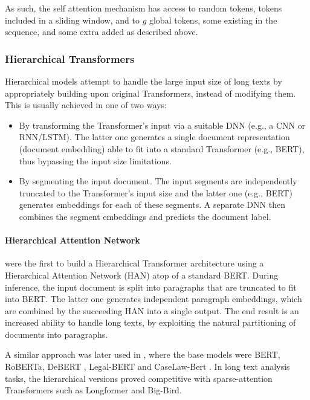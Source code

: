 \documentclass[preprint,review,12pt]{elsarticle}
\begin{document}
As such, the self attention mechanism has access to random tokens, tokens included in a sliding window, and to $g$ global tokens, some existing in the sequence, and some extra added as described above. %

\subsubsection{Hierarchical Transformers}

Hierarchical models attempt to handle the large input size of long texts by appropriately building upon original Transformers, instead of modifying them. This is usually achieved in one of two ways:

\begin{itemize}
    \item By transforming the Transformer's input via a suitable DNN (e.g., a CNN or RNN/LSTM). The latter one generates a single document representation (document embedding) able to fit into a standard Transformer (e.g., BERT), thus bypassing the input size limitations.

    \item By segmenting the input document. The input segments are independently truncated to the Transformer's input size and the latter one (e.g., BERT) generates embeddings for each of these segments. A separate DNN then combines the segment embeddings and predicts the document label.
\end{itemize}

\paragraph{Hierarchical Attention Network} \citet{ion_han} were the first to build a Hierarchical Transformer architecture using a Hierarchical Attention Network (HAN) \cite{zichao} atop of a standard BERT. During inference, the input document is split into paragraphs that are truncated to fit into BERT. The latter one generates independent paragraph embeddings, which are combined by the succeeding HAN into a single output. The end result is an increased ability to handle long texts, by exploiting the natural partitioning of documents into paragraphs.

A similar approach was later used in \citet{glue_gunner}, where the base models were BERT, RoBERTa, DeBERT \cite{yanguang}, Legal-BERT \cite{ion6} and CaseLaw-Bert \cite{zheng}. In long text analysis tasks, the hierarchical versions proved competitive  with sparse-attention Transformers such as Longformer and Big-Bird. 
\end{document}
